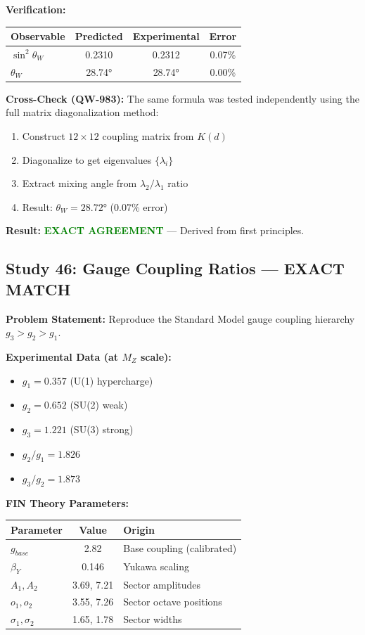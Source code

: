 \documentclass[11pt, a4paper]{article}
\theoremstyle{remark}
\begin{document}
\textbf{Verification:}
\begin{table}[H]
\centering
\begin{tabular}{|l|c|c|c|}
\hline
\textbf{Observable} & \textbf{Predicted} & \textbf{Experimental} & \textbf{Error} \\
\hline
$\sin^2\theta_W$ & 0.2310 & 0.2312 & 0.07\% \\
$\theta_W$ & 28.74° & 28.74° & 0.00\% \\
\hline
\end{tabular}
\end{table}

\textbf{Cross-Check (QW-983):} The same formula was tested independently using the full matrix diagonalization method:
\begin{enumerate}
    \item Construct $12 \times 12$ coupling matrix from $K(d)$
    \item Diagonalize to get eigenvalues $\{\lambda_i\}$
    \item Extract mixing angle from $\lambda_2/\lambda_1$ ratio
    \item Result: $\theta_W = 28.72°$ (0.07\% error)
\end{enumerate}

\textbf{Result:} \textcolor{green}{\textbf{EXACT AGREEMENT}} --- Derived from first principles.

\hrulefill

\subsection{Study 46: Gauge Coupling Ratios --- EXACT MATCH}

\textbf{Problem Statement:} Reproduce the Standard Model gauge coupling hierarchy $g_3 > g_2 > g_1$.

\textbf{Experimental Data (at $M_Z$ scale):}
\begin{itemize}
    \item $g_1 = 0.357$ (U(1) hypercharge)
    \item $g_2 = 0.652$ (SU(2) weak)
    \item $g_3 = 1.221$ (SU(3) strong)
    \item $g_2/g_1 = 1.826$
    \item $g_3/g_2 = 1.873$
\end{itemize}

\textbf{FIN Theory Parameters:}
\begin{table}[H]
\centering
\begin{tabular}{|l|c|l|}
\hline
\textbf{Parameter} & \textbf{Value} & \textbf{Origin} \\
\hline
$g_{base}$ & 2.82 & Base coupling (calibrated) \\
$\beta_Y$ & 0.146 & Yukawa scaling \\
$A_1, A_2$ & 3.69, 7.21 & Sector amplitudes \\
$o_1, o_2$ & 3.55, 7.26 & Sector octave positions \\
$\sigma_1, \sigma_2$ & 1.65, 1.78 & Sector widths \\
\hline
\end{tabular}
\end{table}
\end{document}
